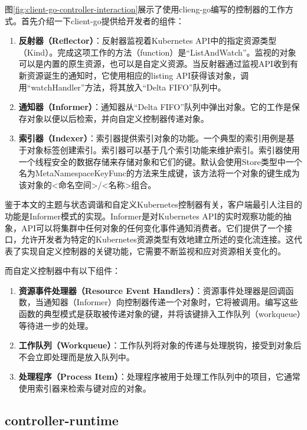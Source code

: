 \documentclass[macfonts,master]{njuthesis}
\begin{document}
图\ref{fig:client-go-controller-interaction}展示了使用clieng-go编写的控制器的工作方式。首先介绍一下client-go提供给开发者的组件：
\begin{enumerate}
	\item \textbf{反射器（Reflector）}：反射器监视着Kubernetes API中的指定资源类型（Kind）。完成这项工作的方法（function）是``ListAndWatch''。监视的对象可以是内置的原生资源，也可以是自定义资源。当反射器通过监视API收到有新资源诞生的通知时，它使用相应的listing API获得该对象，调用``watchHandler''方法，将其放入``Delta FIFO''队列中。
	\item \textbf{通知器（Informer）}：通知器从``Delta FIFO''队列中弹出对象。它的工作是保存对象以便以后检索，并向自定义控制器传递对象。
	\item \textbf{索引器（Indexer）}：索引器提供索引对象的功能。一个典型的索引用例是基于对象标签创建索引。索引器可以基于几个索引功能来维护索引。索引器使用一个线程安全的数据存储来存储对象和它们的键。默认会使用Store类型中一个名为MetaNamespaceKeyFunc的方法来生成键，该方法将一个对象的键生成为该对象的<命名空间>/<名称>组合。
\end{enumerate}

鉴于本文的主题与状态调谐和自定义Kubernetes控制器有关，客户端最引人注目的功能是Informer模式的实现\cite{informer}。Informer是对Kubernetes API的实时观察功能的抽象，API可以将集群中任何对象的任何变化事件通知消费者。它们提供了一个接口，允许开发者为特定的Kubernetes资源类型有效地建立所述的变化流连接\cite{informer}。这代表了实现自定义控制器的关键功能，它需要不断监视和应对资源相关变化的。

而自定义控制器中有以下组件：
\begin{enumerate}
	\item \textbf{资源事件处理器（Resource Event Handlers）}：资源事件处理器是回调函数，当通知器（Informer）向控制器传递一个对象时，它将被调用。编写这些函数的典型模式是获取被传递对象的键，并将该键排入工作队列（workqueue）等待进一步的处理。
	\item \textbf{工作队列（Workqueue）}：工作队列将对象的传递与处理脱钩，接受到对象后不会立即处理而是放入队列中。
	\item \textbf{处理程序（Process Item）}：处理程序被用于处理工作队列中的项目，它通常使用索引器来检索与键对应的对象。
\end{enumerate}

\subsection{controller-runtime}
\end{document}
